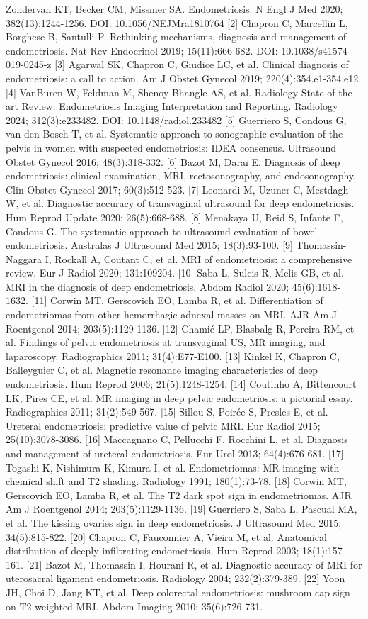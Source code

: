 \documentclass[11pt,a4paper]{article}
\begin{document}
\noindent [1] Zondervan KT, Becker CM, Missmer SA. Endometriosis. N Engl J Med 2020; 382(13):1244-1256. DOI: 10.1056/NEJMra1810764 [2] Chapron C, Marcellin L, Borghese B, Santulli P. Rethinking mechanisms, diagnosis and management of endometriosis. Nat Rev Endocrinol 2019; 15(11):666-682. DOI: 10.1038/s41574-019-0245-z [3] Agarwal SK, Chapron C, Giudice LC, et al. Clinical diagnosis of endometriosis: a call to action. Am J Obstet Gynecol 2019; 220(4):354.e1-354.e12. [4] VanBuren W, Feldman M, Shenoy-Bhangle AS, et al. Radiology State-of-the-art Review: Endometriosis Imaging Interpretation and Reporting. Radiology 2024; 312(3):e233482. DOI: 10.1148/radiol.233482 [5] Guerriero S, Condous G, van den Bosch T, et al. Systematic approach to sonographic evaluation of the pelvis in women with suspected endometriosis: IDEA consensus. Ultrasound Obstet Gynecol 2016; 48(3):318-332. [6] Bazot M, Daraï E. Diagnosis of deep endometriosis: clinical examination, MRI, rectosonography, and endosonography. Clin Obstet Gynecol 2017; 60(3):512-523. [7] Leonardi M, Uzuner C, Mestdagh W, et al. Diagnostic accuracy of transvaginal ultrasound for deep endometriosis. Hum Reprod Update 2020; 26(5):668-688. [8] Menakaya U, Reid S, Infante F, Condous G. The systematic approach to ultrasound evaluation of bowel endometriosis. Australas J Ultrasound Med 2015; 18(3):93-100. [9] Thomassin-Naggara I, Rockall A, Coutant C, et al. MRI of endometriosis: a comprehensive review. Eur J Radiol 2020; 131:109204. [10] Saba L, Sulcis R, Melis GB, et al. MRI in the diagnosis of deep endometriosis. Abdom Radiol 2020; 45(6):1618-1632. [11] Corwin MT, Gerscovich EO, Lamba R, et al. Differentiation of endometriomas from other hemorrhagic adnexal masses on MRI. AJR Am J Roentgenol 2014; 203(5):1129-1136. [12] Chamié LP, Blasbalg R, Pereira RM, et al. Findings of pelvic endometriosis at transvaginal US, MR imaging, and laparoscopy. Radiographics 2011; 31(4):E77-E100. [13] Kinkel K, Chapron C, Balleyguier C, et al. Magnetic resonance imaging characteristics of deep endometriosis. Hum Reprod 2006; 21(5):1248-1254. [14] Coutinho A, Bittencourt LK, Pires CE, et al. MR imaging in deep pelvic endometriosis: a pictorial essay. Radiographics 2011; 31(2):549-567. [15] Sillou S, Poirée S, Presles E, et al. Ureteral endometriosis: predictive value of pelvic MRI. Eur Radiol 2015; 25(10):3078-3086. [16] Maccagnano C, Pellucchi F, Rocchini L, et al. Diagnosis and management of ureteral endometriosis. Eur Urol 2013; 64(4):676-681. [17] Togashi K, Nishimura K, Kimura I, et al. Endometriomas: MR imaging with chemical shift and T2 shading. Radiology 1991; 180(1):73-78. [18] Corwin MT, Gerscovich EO, Lamba R, et al. The T2 dark spot sign in endometriomas. AJR Am J Roentgenol 2014; 203(5):1129-1136. [19] Guerriero S, Saba L, Pascual MA, et al. The kissing ovaries sign in deep endometriosis. J Ultrasound Med 2015; 34(5):815-822. [20] Chapron C, Fauconnier A, Vieira M, et al. Anatomical distribution of deeply infiltrating endometriosis. Hum Reprod 2003; 18(1):157-161. [21] Bazot M, Thomassin I, Hourani R, et al. Diagnostic accuracy of MRI for uterosacral ligament endometriosis. Radiology 2004; 232(2):379-389. [22] Yoon JH, Choi D, Jang KT, et al. Deep colorectal endometriosis: mushroom cap sign on T2-weighted MRI. Abdom Imaging 2010; 35(6):726-731.\\
\end{document}
